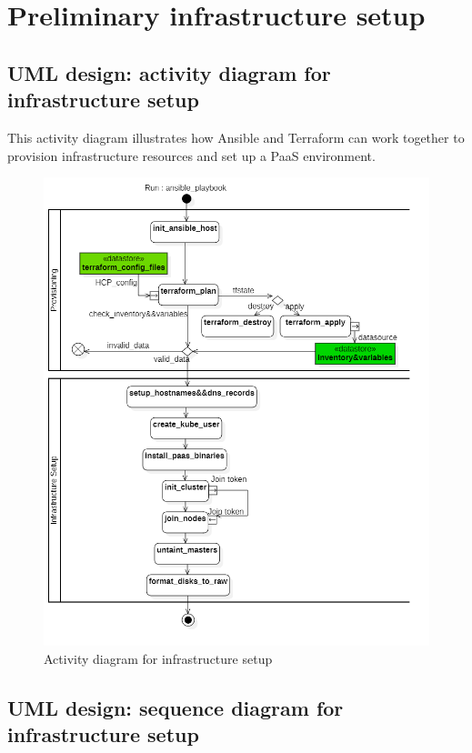 \section{Preliminary infrastructure setup}
\subsection{UML design: activity diagram for infrastructure setup}

This activity diagram illustrates how Ansible and Terraform can work together to provision infrastructure resources and set up a PaaS environment.

\begin{figure}[H]\centering
\includegraphics[width=1.0\textwidth,angle=00]{assets/f20.png}
\caption{Activity diagram for infrastructure setup}
\label{fig:activity diagram for infrastructure setup}
\end{figure}


\subsection{UML design: sequence diagram for infrastructure setup}

